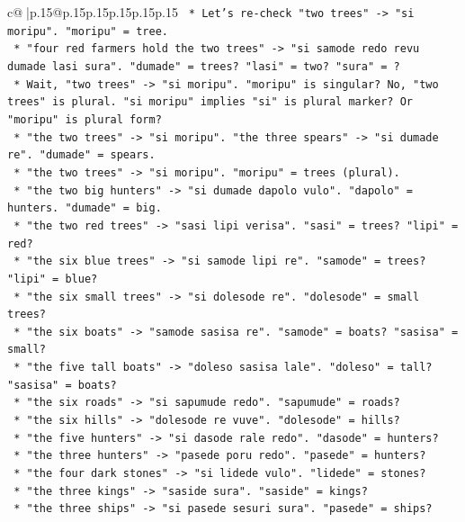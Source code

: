 \documentclass{article}
\begin{document}
{\begin{supertabular}{c@{$\;$}|p{.15\linewidth}@{}p{.15\linewidth}p{.15\linewidth}p{.15\linewidth}p{.15\linewidth}p{.15\linewidth}}
{{{\texttt{            *   Let's re{-}check "two trees" {-}> "si moripu". "moripu" = tree.} \\
\texttt{            *   "four red farmers hold the two trees" {-}> "si samode redo revu dumade lasi sura". "dumade" = trees? "lasi" = two? "sura" = ?} \\
\texttt{            *   Wait, "two trees" {-}> "si moripu". "moripu" is singular? No, "two trees" is plural. "si moripu" implies "si" is plural marker? Or "moripu" is plural form?} \\
\texttt{            *   "the two trees" {-}> "si moripu". "the three spears" {-}> "si dumade re". "dumade" = spears.} \\
\texttt{            *   "the two trees" {-}> "si moripu". "moripu" = trees (plural).} \\
\texttt{            *   "the two big hunters" {-}> "si dumade dapolo vulo". "dapolo" = hunters. "dumade" = big.} \\
\texttt{            *   "the two red trees" {-}> "sasi lipi verisa". "sasi" = trees? "lipi" = red?} \\
\texttt{            *   "the six blue trees" {-}> "si samode lipi re". "samode" = trees? "lipi" = blue?} \\
\texttt{            *   "the six small trees" {-}> "si dolesode re". "dolesode" = small trees?} \\
\texttt{            *   "the six boats" {-}> "samode sasisa re". "samode" = boats? "sasisa" = small?} \\
\texttt{            *   "the five tall boats" {-}> "doleso sasisa lale". "doleso" = tall? "sasisa" = boats?} \\
\texttt{            *   "the six roads" {-}> "si sapumude redo". "sapumude" = roads?} \\
\texttt{            *   "the six hills" {-}> "dolesode re vuve". "dolesode" = hills?} \\
\texttt{            *   "the five hunters" {-}> "si dasode rale redo". "dasode" = hunters?} \\
\texttt{            *   "the three hunters" {-}> "pasede poru redo". "pasede" = hunters?} \\
\texttt{            *   "the four dark stones" {-}> "si lidede vulo". "lidede" = stones?} \\
\texttt{            *   "the three kings" {-}> "saside sura". "saside" = kings?} \\
\texttt{            *   "the three ships" {-}> "si pasede sesuri sura". "pasede" = ships?} \\
}}}
\end{supertabular}}
\end{document}

